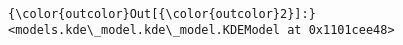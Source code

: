 \documentclass[11pt]{article}
\begin{document}
    \begin{center}
    \end{center}
    { \hspace*{\fill} \\}
    
    \begin{center}
    \end{center}
    { \hspace*{\fill} \\}
    
    \begin{center}
    \end{center}
    { \hspace*{\fill} \\}
    
\begin{Verbatim}[commandchars=\\\{\}]
{\color{outcolor}Out[{\color{outcolor}2}]:} <models.kde\_model.kde\_model.KDEModel at 0x1101cee48>
\end{Verbatim}
            

    
    
    
    
\end{document}
